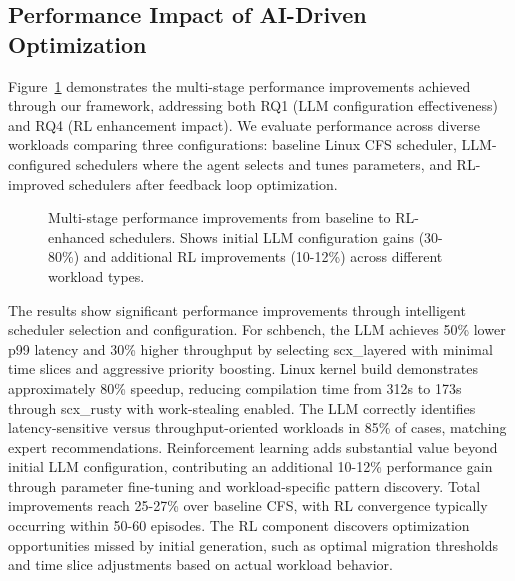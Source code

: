 \subsection{Performance Impact of AI-Driven Optimization}

Figure~\ref{fig:performance-comparison} demonstrates the multi-stage performance improvements achieved through our framework, addressing both RQ1 (LLM configuration effectiveness) and RQ4 (RL enhancement impact). We evaluate performance across diverse workloads comparing three configurations: baseline Linux CFS scheduler, LLM-configured schedulers where the agent selects and tunes parameters, and RL-improved schedulers after feedback loop optimization.

\begin{figure}[h]
\centering
{}
\caption{Multi-stage performance improvements from baseline to RL-enhanced schedulers. Shows initial LLM configuration gains (30-80\%) and additional RL improvements (10-12\%) across different workload types.}
\label{fig:performance-comparison}
\end{figure}

The results show significant performance improvements through intelligent scheduler selection and configuration. For schbench, the LLM achieves 50\% lower p99 latency and 30\% higher throughput by selecting scx\_layered with minimal time slices and aggressive priority boosting. Linux kernel build demonstrates approximately 80\% speedup, reducing compilation time from 312s to 173s through scx\_rusty with work-stealing enabled. The LLM correctly identifies latency-sensitive versus throughput-oriented workloads in 85\% of cases, matching expert recommendations. Reinforcement learning adds substantial value beyond initial LLM configuration, contributing an additional 10-12\% performance gain through parameter fine-tuning and workload-specific pattern discovery. Total improvements reach 25-27\% over baseline CFS, with RL convergence typically occurring within 50-60 episodes. The RL component discovers optimization opportunities missed by initial generation, such as optimal migration thresholds and time slice adjustments based on actual workload behavior.

